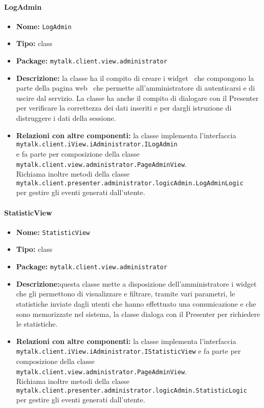 {{\paragraph{LogAdmin}{
	\begin{itemize}
		\item [] \textbf{Nome:} \texttt{LogAdmin}
		\item [] \textbf{Tipo:} class
		\item [] \textbf{Package:} \texttt{mytalk.client.view.administrator}
		\item [] \textbf{Descrizione:}{ la classe ha il compito di creare i widget\g~ che compongono la parte della pagina web\g~ che permette all'amministratore di autenticarsi e di uscire dal servizio. La classe ha anche il compito di dialogare con il Presenter per verificare la correttezza dei dati inseriti e per dargli istruzione di distruggere i dati della sessione.}
		\item [] \textbf{Relazioni con altre componenti:} la classe implementa l'interfaccia\\ \texttt{mytalk.client.iView.iAdministrator.ILogAdmin}\\ e fa parte per composizione della classe\\ \texttt{mytalk.client.view.administrator.PageAdminView}.\\
		Richiama inoltre metodi della classe\\ \texttt{mytalk.client.presenter.administrator.logicAdmin.LogAdminLogic}\\ per gestire gli eventi generati dall'utente.
	\end{itemize}
}
\paragraph{StatisticView}{
	\begin{itemize}
		\item [] \textbf{Nome:} \texttt{StatisticView}
		\item [] \textbf{Tipo:} class
		\item [] \textbf{Package:} \texttt{mytalk.client.view.administrator}
		\item [] \textbf{Descrizione:}{questa classe mette a disposizione dell'amministratore i widget\g~ che gli permettono di visualizzare e filtrare, tramite vari parametri, le statistiche inviate dagli utenti che hanno effettuato una comunicazione e che sono memorizzate nel sistema, la classe dialoga con il Presenter per richiedere le statistiche.}
		\item [] \textbf{Relazioni con altre componenti:}{ la classe implementa l'interfaccia\\ \texttt{mytalk.client.iView.iAdministrator.IStatisticView} e fa parte per composizione della classe \texttt{mytalk.client.view.administrator.PageAdminView}.\\ Richiama inoltre metodi della classe\\ \texttt{mytalk.client.presenter.administrator.logicAdmin.StatisticLogic}\\ per gestire gli eventi generati dall'utente.}
	\end{itemize}
}
}%


}
